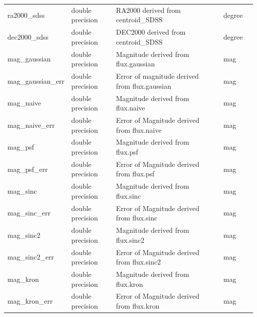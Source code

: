 \documentclass[12pt]{article}
\begin{document}
\begin{table}[thbp]
\begin{center}
{\begin{tabular}{llllll}
ra2000\_sdss & double precision & RA2000 derived from centroid\_SDSS                        &                           & degree           &             \\
dec2000\_sdss & double precision & DEC2000 derived from centroid\_SDSS                       &                           & degree           &             \\
mag\_gaussian & double precision & Magnitude derived from flux.gaussian                     &                           & mag              &             \\
mag\_gaussian\_err & double precision & Error of magnitude derived from flux.gaussian            &                           & mag              &             \\
mag\_naive & double precision & Magnitude derived from flux.naive                        &                           & mag              &             \\
mag\_naive\_err & double precision & Error of Magnitude derived from flux.naive               &                           & mag              &             \\
mag\_psf & double precision & Magnitude derived from flux.psf                          &                           & mag              &             \\
mag\_psf\_err & double precision & Error of Magnitude derived from flux.psf                 &                           & mag              &             \\
mag\_sinc & double precision & Magnitude derived from flux.sinc                         &                           & mag              &             \\
mag\_sinc\_err & double precision & Error of Magnitude derived from flux.sinc                &                           & mag              &             \\
mag\_sinc2 & double precision & Magnitude derived from flux.sinc2                         &                           & mag              &             \\
mag\_sinc2\_err & double precision & Error of Magnitude derived from flux.sinc2                &                           & mag              &             \\
mag\_kron & double precision & Magnitude derived from flux.kron                         &                           & mag              &             \\
mag\_kron\_err & double precision & Error of Magnitude derived from flux.kron                &                           & mag              &             \\

\end{tabular}}
\end{center}
\end{table}
\end{document}
